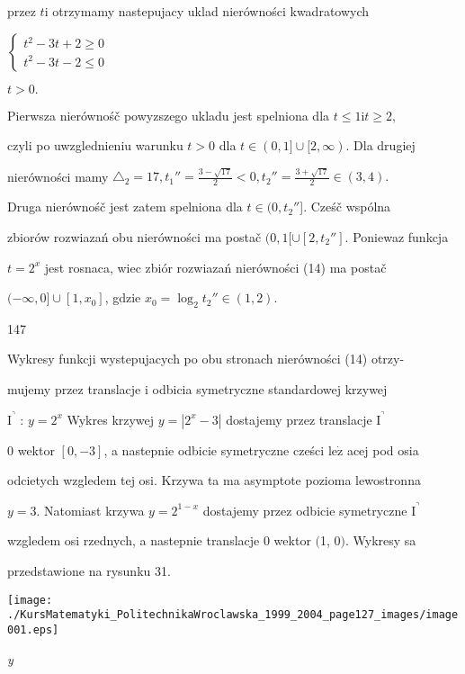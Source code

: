 \documentclass[a4paper,12pt]{article}
\begin{document}
przez $t\mathrm{i}$ otrzymamy nastepujacy uklad nierówności kwadratowych

$\left\{\begin{array}{l}
t^{2}-3t+2\geq 0\\
t^{2}-3t-2\leq 0
\end{array}\right.$

$t>0.$

Pierwsza nierównośč powyzszego ukladu jest spelniona dla $t \leq 1 \mathrm{i}t \geq 2,$

czyli po uwzglednieniu warunku $t> 0$ dla $ t\in (0,1]\cup[2,\infty)$. Dla drugiej

nierówności mamy $\triangle_{2} = 17, t_{1}'' = \displaystyle \frac{3-\sqrt{17}}{2} < 0, t_{2}'' = \displaystyle \frac{3+\sqrt{17}}{2} \in (3,4).$

Druga nierównośč jest zatem spelniona dla $t \in (0,t_{2}''$]. Cześč wspólna

zbiorów rozwiazań obu nierówności ma postač $(0,1[\cup[2,t_{2}'']$. Poniewaz funkcja

$t = 2^{x}$ jest rosnaca, wiec zbiór rozwiazań nierówności (14) ma postač

$(-\infty,0]\cup[1,x_{0}]$, gdzie $x_{0}=\log_{2}t_{2}''\in(1,2).$





147

Wykresy funkcji wystepujacych po obu stronach nierówności (14) otrzy-

mujemy przez translacje $\mathrm{i}$ odbicia symetryczne standardowej krzywej

$\mathrm{I}^{\urcorner}$ : $y = 2^{x}$ Wykres krzywej $y = |2^{x}-3|$ dostajemy przez translacje $\mathrm{I}^{\urcorner}$

$0$ wektor $[0,-3]$, a nastepnie odbicie symetryczne cześci $\mathrm{l}\mathrm{e}\dot{\mathrm{z}}$ acej pod osia

odcietych wzgledem tej osi. Krzywa ta ma asymptote pozioma lewostronna

$y=3$. Natomiast krzywa $y=2^{1-x}$ dostajemy przez odbicie symetryczne $\mathrm{I}^{\urcorner}$

wzgledem osi rzednych, a nastepnie translacje $0$ wektor $($1, $0)$. Wykresy sa

przedstawione na rysunku 31.
\begin{center}
\texttt{[image: ./KursMatematyki\_PolitechnikaWroclawska\_1999\_2004\_page127\_images/image001.eps]}
\end{center}
{\it y}
\end{document}
